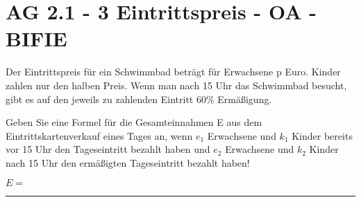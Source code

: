 \section{AG 2.1 - 3 Eintrittspreis - OA - BIFIE}

\begin{beispiel}[AG 2.1]{1} %
	Der Eintrittspreis für ein Schwimmbad beträgt für Erwachsene p Euro. Kinder zahlen nur den halben Preis. Wenn man nach 15 Uhr das Schwimmbad besucht, gibt es auf den jeweils zu
zahlenden Eintritt 60\% Ermäßigung. 	
\leer

Geben Sie eine Formel für die Gesamteinnahmen E aus dem Eintrittskartenverkauf eines Tages an, wenn $e_1$ Erwachsene und $k_1$ Kinder bereits vor 15 Uhr den Tageseintritt bezahlt haben und $e_2$ Erwachsene und $k_2$ Kinder nach 15 Uhr den ermäßigten Tageseintritt bezahlt haben!
\leer

$E=$ \rule{7cm}{0.5pt}

\end{beispiel}